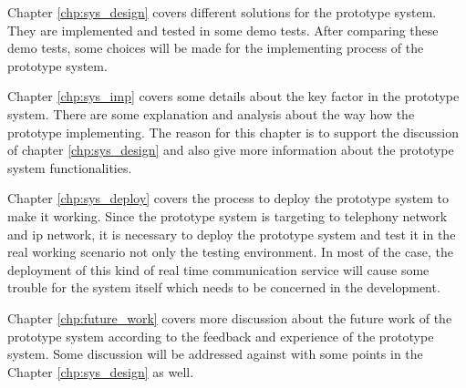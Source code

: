 \par Chapter \ref{chp:sys_design} covers different solutions for the prototype system. They are implemented and tested in some demo tests. After comparing these demo tests, some choices will be made for the implementing process of the prototype system.

\par Chapter \ref{chp:sys_imp} covers some details about the key factor in the prototype system. There are some explanation and analysis about the way how the prototype implementing. The reason for this chapter is to support the discussion of chapter \ref{chp:sys_design} and also give more information about the prototype system functionalities.

\par Chapter \ref{chp:sys_deploy} covers the process to deploy the prototype system to make it working. Since the prototype system is targeting to telephony network and \gls{ip} network, it is necessary to deploy the prototype system and test it in the real working scenario not only the testing environment. In most of the case, the deployment of this kind of real time communication service will cause some trouble for the system itself which needs to be concerned in the development.

\par Chapter \ref{chp:future_work} covers more discussion about the future work of the prototype system according to the feedback and experience of the prototype system. Some discussion will be addressed against with some points in the Chapter \ref{chp:sys_design} as well.

